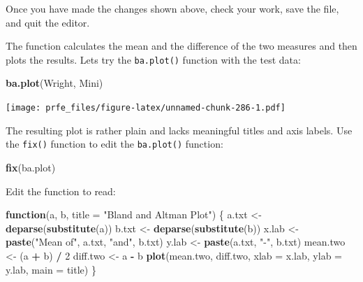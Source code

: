 \documentclass[12pt,]{book}
\newenvironment{Shaded}{\begin{snugshade}}{\end{snugshade}}
\newcommand{\KeywordTok}[1]{\textcolor[rgb]{0.13,0.29,0.53}{\textbf{#1}}}
\newcommand{\DataTypeTok}[1]{\textcolor[rgb]{0.13,0.29,0.53}{#1}}
\newcommand{\DecValTok}[1]{\textcolor[rgb]{0.00,0.00,0.81}{#1}}
\newcommand{\StringTok}[1]{\textcolor[rgb]{0.31,0.60,0.02}{#1}}
\newcommand{\ControlFlowTok}[1]{\textcolor[rgb]{0.13,0.29,0.53}{\textbf{#1}}}
\newcommand{\OperatorTok}[1]{\textcolor[rgb]{0.81,0.36,0.00}{\textbf{#1}}}
\newcommand{\NormalTok}[1]{#1}
\theoremstyle{definition}
\theoremstyle{definition}
\theoremstyle{definition}
\theoremstyle{remark}
\begin{document}
Once you have made the changes shown above, check your work, save the
file, and quit the editor.

The function calculates the mean and the difference of the two measures
and then plots the results. Lets try the \texttt{ba.plot()} function
with the test data:

\begin{Shaded}
\begin{Highlighting}[]
\KeywordTok{ba.plot}\NormalTok{(Wright, Mini)}
\end{Highlighting}
\end{Shaded}

\texttt{[image: prfe\_files/figure-latex/unnamed-chunk-286-1.pdf]}

The resulting plot is rather plain and lacks meaningful titles and axis
labels. Use the \texttt{fix()} function to edit the \texttt{ba.plot()}
function:

\begin{Shaded}
\begin{Highlighting}[]
\KeywordTok{fix}\NormalTok{(ba.plot)}
\end{Highlighting}
\end{Shaded}

Edit the function to read:

\begin{Shaded}
\begin{Highlighting}[]
\ControlFlowTok{function}\NormalTok{(a, b, }\DataTypeTok{title =} \StringTok{"Bland and Altman Plot"}\NormalTok{) \{}
\NormalTok{  a.txt <-}\StringTok{ }\KeywordTok{deparse}\NormalTok{(}\KeywordTok{substitute}\NormalTok{(a))}
\NormalTok{  b.txt <-}\StringTok{ }\KeywordTok{deparse}\NormalTok{(}\KeywordTok{substitute}\NormalTok{(b))}
\NormalTok{  x.lab <-}\StringTok{ }\KeywordTok{paste}\NormalTok{(}\StringTok{"Mean of"}\NormalTok{, a.txt, }\StringTok{"and"}\NormalTok{, b.txt)}
\NormalTok{  y.lab <-}\StringTok{ }\KeywordTok{paste}\NormalTok{(a.txt, }\StringTok{"-"}\NormalTok{, b.txt)}
\NormalTok{  mean.two <-}\StringTok{ }\NormalTok{(a }\OperatorTok{+}\StringTok{ }\NormalTok{b) }\OperatorTok{/}\StringTok{ }\DecValTok{2}
\NormalTok{  diff.two <-}\StringTok{ }\NormalTok{a }\OperatorTok{-}\StringTok{ }\NormalTok{b}
  \KeywordTok{plot}\NormalTok{(mean.two, diff.two, }\DataTypeTok{xlab =}\NormalTok{ x.lab, }\DataTypeTok{ylab =}\NormalTok{ y.lab, }\DataTypeTok{main =}\NormalTok{ title)}
\NormalTok{\}}
\end{Highlighting}
\end{Shaded}
\end{document}
